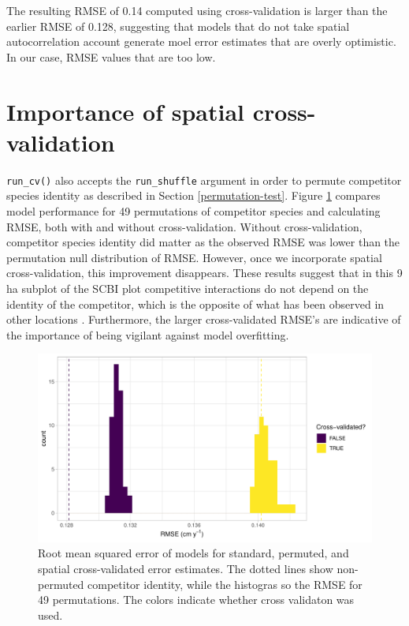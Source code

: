\documentclass[12pt]{article}
\begin{document}
The resulting RMSE of 0.14 computed using cross-validation is larger
than the earlier RMSE of 0.128, suggesting that models that do not take
spatial autocorrelation account generate moel error estimates that are
overly optimistic. In our case, RMSE values that are too low.

\hypertarget{importance-of-spatial-cross-validation}{%
\section{Importance of spatial
cross-validation}\label{importance-of-spatial-cross-validation}}

\texttt{run\_cv()} also accepts the \texttt{run\_shuffle} argument in
order to permute competitor species identity as described in Section
\ref{permutation-test}. Figure \ref{fig:scbi-simulation} compares model
performance for 49 permutations of competitor species and calculating
RMSE, both with and without cross-validation. Without cross-validation,
competitor species identity did matter as the observed RMSE was lower
than the permutation null distribution of RMSE. However, once we
incorporate spatial cross-validation, this improvement disappears. These
results suggest that in this 9 ha subplot of the SCBI plot competitive
interactions do not depend on the identity of the competitor, which is
the opposite of what has been observed in other locations \citep[
\citet{uriarte_spatially_2004}]{allen_permutation_2020}. Furthermore,
the larger cross-validated RMSE's are indicative of the importance of
being vigilant against model overfitting.

\begin{figure}

{\centering \includegraphics[width=1\linewidth]{simulation_results/2021-03-03_scbi_49_shuffles} 

}

\caption{Root mean squared error of models for standard, permuted, and spatial cross-validated error estimates. The dotted lines show non-permuted competitor identity, while the histogras so the RMSE for 49 permutations. The colors indicate whether cross validaton was used.}\label{fig:scbi-simulation}
\end{figure}
\end{document}
